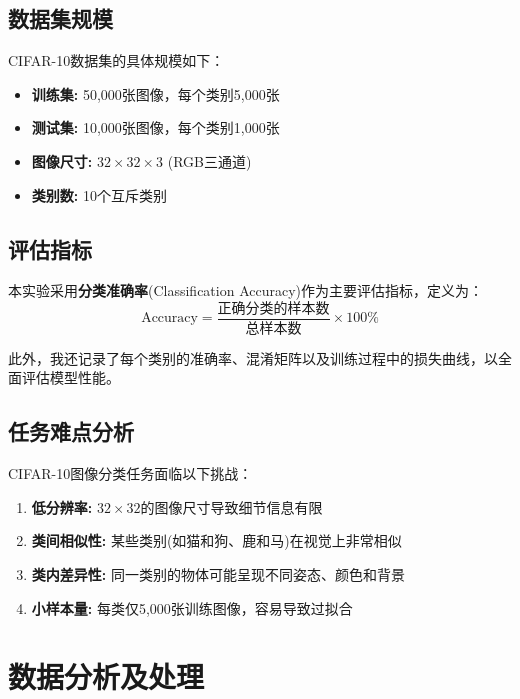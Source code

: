 \documentclass[12pt,a4paper]{article}
\begin{document}
\subsection{数据集规模}

CIFAR-10数据集的具体规模如下：
\begin{itemize}[leftmargin=2em]
    \item \textbf{训练集:} 50,000张图像，每个类别5,000张
    \item \textbf{测试集:} 10,000张图像，每个类别1,000张
    \item \textbf{图像尺寸:} $32 \times 32 \times 3$ (RGB三通道)
    \item \textbf{类别数:} 10个互斥类别
\end{itemize}

\subsection{评估指标}

本实验采用\textbf{分类准确率}(Classification Accuracy)作为主要评估指标，定义为：
\begin{equation}
    \text{Accuracy} = \frac{\text{正确分类的样本数}}{\text{总样本数}} \times 100\%
\end{equation}

此外，我还记录了每个类别的准确率、混淆矩阵以及训练过程中的损失曲线，以全面评估模型性能。

\subsection{任务难点分析}

CIFAR-10图像分类任务面临以下挑战：
\begin{enumerate}[leftmargin=2em]
    \item \textbf{低分辨率:} $32 \times 32$的图像尺寸导致细节信息有限
    \item \textbf{类间相似性:} 某些类别(如猫和狗、鹿和马)在视觉上非常相似
    \item \textbf{类内差异性:} 同一类别的物体可能呈现不同姿态、颜色和背景
    \item \textbf{小样本量:} 每类仅5,000张训练图像，容易导致过拟合
\end{enumerate}

\section{数据分析及处理}
\end{document}
